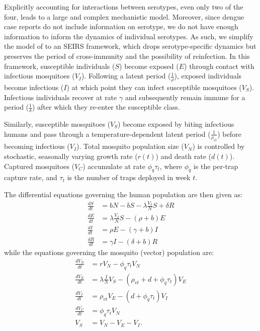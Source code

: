 \documentclass[10pt,letterpaper]{article}
\begin{document}
Explicitly accounting for interactions between serotypes, even only two of the four, leads to a large and complex mechanistic model.
Moreover, since dengue case reports do not include information on serotype, we do not have enough information to inform the dynamics of individual serotypes.
As such, we simplify the model of \cite{Wearing2006} to an SEIRS framework, which drops serotype-specific dynamics but preserves the period of cross-immunity and the possibility of reinfection.
In this framework, susceptible individuals ($S$) become exposed ($E$) through contact with infectious mosquitoes ($V_I$).
Following a latent period ($\frac{1}{\rho}$), exposed individuals become infectious ($I$) at which point they can infect susceptible mosquitoes ($V_S$).
Infectious individuals recover at rate $\gamma$ and subsequently remain immune for a period ($\frac{1}{\delta}$) after which they re-enter the susceptible class.

Similarly, susceptible mosquitoes ($V_S$) become exposed by biting infectious humans and pass through a temperature-dependent latent period ($\frac{1}{\rho_{vt}}$) before becoming infectious ($V_I$).
Total mosquito population size ($V_N$) is controlled by stochastic, seasonally varying growth rate ($r(t)$) and death rate ($d(t)$).
Captured mosquitoes ($V_C$) accumulate at rate $\phi_q \tau_t$, where $\phi_q$ is the per-trap capture rate, and $\tau_t$ is the number of traps deployed in week $t$.

The differential equations governing the human population are then given as:
\begin{align} 
\frac{dS}{dt} &= bN - bS - \lambda \frac{V_{I}}{N} S + \delta R\\
\frac{dE}{dt} &= \lambda \frac{V_{I}}{N} S - (\rho + b)E\\
\frac{dI}{dt} &= \rho E - (\gamma + b)I\\
\frac{dR}{dt} &= \gamma I - (\delta + b)R
\end{align}
while the equations governing the mosquito (vector) population are:
\begin{align}
\frac{dV_N}{dt} & = r V_N - \phi_q \tau_t V_N \\
\frac{dV_E}{dt} &= \lambda \frac{I}{N} V_S - (\rho_{vt} + d + \phi_q \tau_t)V_E\\
\frac{dV_I}{dt} &= \rho_{vt} V_E - (d + \phi_q \tau_t) V_I\\
\frac{dV_C}{dt} & = \phi_q \tau_t V_N\\
V_S &= V_N - V_E - V_I.
\end{align}
\end{document}
